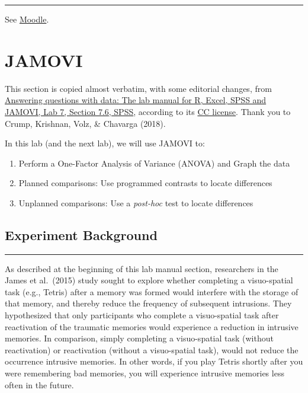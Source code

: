 \documentclass[
]{book}
\providecommand{\tightlist}{%
  \setlength{\itemsep}{0pt}\setlength{\parskip}{0pt}}
\begin{document}
\begin{center}\rule{0.5\linewidth}{0.5pt}\end{center}

See \href{https://moodle.stfx.ca/course/view.php?id=25132}{Moodle}.

\hypertarget{jamovi}{%
\section{JAMOVI}\label{jamovi}}

This section is copied almost verbatim, with some editorial changes, from \href{https://www.erinmazerolle.com/statisticsLab/lab-7-one-way-anova.html\#spss-7}{Answering questions with data: The lab manual for R, Excel, SPSS and JAMOVI, Lab 7, Section 7.6, SPSS}, according to its \href{https://creativecommons.org/licenses/by-sa/4.0/deed.ast}{CC license}. Thank you to Crump, Krishnan, Volz, \& Chavarga (2018).

In this lab (and the next lab), we will use JAMOVI to:

\begin{enumerate}
\def\labelenumi{\arabic{enumi}.}
\tightlist
\item
  Perform a One-Factor Analysis of Variance (ANOVA) and Graph the data
\item
  Planned comparisons: Use programmed contrasts to locate differences
\item
  Unplanned comparisons: Use a \emph{post-hoc} test to locate differences
\end{enumerate}

\hypertarget{experiment-background-4}{%
\subsection{Experiment Background}\label{experiment-background-4}}

\begin{center}\rule{0.5\linewidth}{0.5pt}\end{center}

As described at the beginning of this lab manual section, researchers in the James et al.~(2015) study sought to explore whether completing a visuo-spatial task (e.g., Tetris) after a memory was formed would interfere with the storage of that memory, and thereby reduce the frequency of subsequent intrusions. They hypothesized that only participants who complete a visuo-spatial task after reactivation of the traumatic memories would experience a reduction in intrusive memories. In comparison, simply completing a visuo-spatial task (without reactivation) or reactivation (without a visuo-spatial task), would not reduce the occurrence intrusive memories. In other words, if you play Tetris shortly after you were remembering bad memories, you will experience intrusive memories less often in the future.
\end{document}
